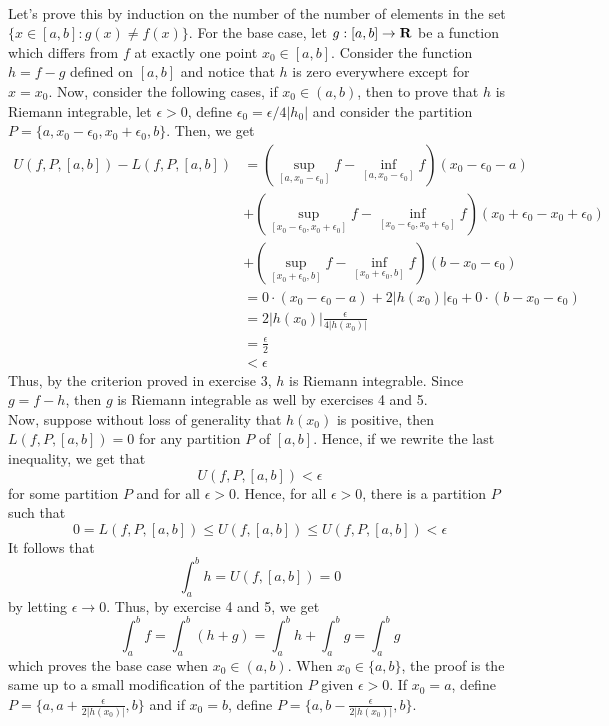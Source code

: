 \begin{solution}
    \\  Let's prove this by induction on the number of the number of elements in the set $\{x \in [a,b] : g(x) \neq f(x)\}$. For the base case, let $g : [a,b] \to \mathbf{R}$ be a function which differs from $f$ at exactly one point $x_0 \in [a,b]$. Consider the function $h = f-g$ defined on $[a,b]$ and notice that $h$ is zero everywhere except for $x = x_0$. Now, consider the following cases, if $x_0 \in (a,b)$, then to prove that $h$ is Riemann integrable, let $\epsilon > 0$, define $\epsilon_0 = \epsilon/4|h_0|$ and consider the partition $P = \{a, x_0 - \epsilon_0, x_0 + \epsilon_0, b\}$. Then, we get
    \begin{align*}
        U(f, P, [a,b]) - L(f, P, [a,b]) &= \left(\sup_{\left[a, x_0 - \epsilon_0 \right]}f - \inf_{\left[a, x_0 - \epsilon_0 \right]}f \right) (x_0 - \epsilon_0 - a) \\ 
        &+ \left(\sup_{\left[x_0 - \epsilon_0, x_0 + \epsilon_0 \right]}f - \inf_{\left[x_0 - \epsilon_0, x_0 + \epsilon_0 \right]}f \right) (x_0 + \epsilon_0 - x_0 + \epsilon_0 )\\
        &+ \left(\sup_{\left[x_0 + \epsilon_0, b\right]}f - \inf_{\left[x_0 + \epsilon_0,b\right]}f \right) (b - x_0 - \epsilon_0)\\ 
        &= 0\cdot (x_0 - \epsilon_0 - a ) + 2|h(x_0)|\epsilon_0 + 0 \cdot (b - x_0 - \epsilon_0) \\
        &= 2|h(x_0)|\frac{\epsilon}{4|h(x_0)|} \\
        &= \frac{\epsilon}{2} \\
        &< \epsilon
    \end{align*}
    Thus, by the criterion proved in exercise 3, $h$ is Riemann integrable. Since $g = f - h$, then $g$ is Riemann integrable as well by exercises 4 and 5. \\
    Now, suppose without loss of generality that $h(x_0)$ is positive, then $L(f, P, [a,b]) = 0$ for any partition $P$ of $[a,b]$. Hence, if we rewrite the last inequality, we get that
    $$U(f, P, [a,b]) < \epsilon$$
    for some partition $P$ and for all $\epsilon > 0$. Hence, for all $\epsilon > 0$, there is a partition $P$ such that
    $$0 = L(f, P, [a,b]) \leq U(f, [a,b]) \leq U(f, P, [a,b]) < \epsilon $$
    It follows that 
    $$\int_{a}^{b}h = U(f, [a,b]) = 0$$
    by letting $\epsilon \rightarrow 0$.
    Thus, by exercise 4 and 5, we get
    $$\int_{a}^{b}f = \int_{a}^{b}(h + g) = \int_{a}^{b}h + \int_{a}^{b}g = \int_{a}^{b}g$$
    which proves the base case when $x_0 \in (a,b)$. When $x_0 \in \{a,b\}$, the proof is the same up to a small modification of the partition $P$ given $\epsilon > 0$. If $x_0 = a$, define $P = \{a, a + \frac{\epsilon}{2|h(x_0)|}, b\}$ and if $x_0 = b$, define $P = \{a, b - \frac{\epsilon}{2|h(x_0)|}, b\}$. \\

\end{solution}
